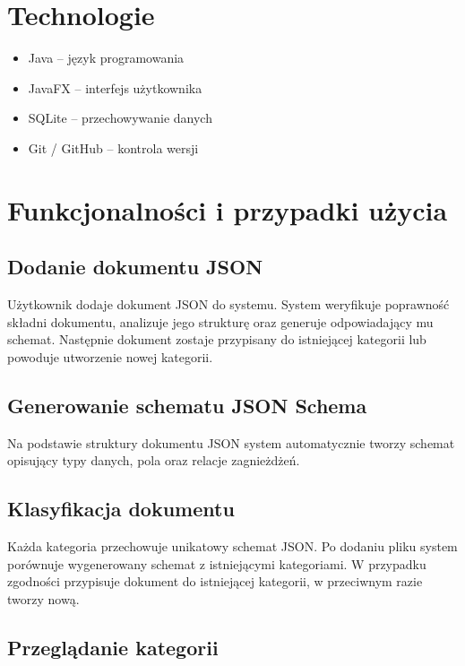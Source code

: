 \documentclass[a4paper,12pt]{article}
\begin{document}
\section{Technologie}

\begin{itemize}
  \item Java -- język programowania
  \item JavaFX -- interfejs użytkownika
  \item SQLite -- przechowywanie danych
  \item Git / GitHub -- kontrola wersji
\end{itemize}

\section{Funkcjonalności i przypadki użycia}

\subsection{Dodanie dokumentu JSON}

Użytkownik dodaje dokument JSON do systemu. System weryfikuje poprawność składni dokumentu, analizuje jego strukturę oraz generuje odpowiadający mu schemat. Następnie dokument zostaje przypisany do istniejącej kategorii lub powoduje utworzenie nowej kategorii.

\subsection{Generowanie schematu JSON Schema}

Na podstawie struktury dokumentu JSON system automatycznie tworzy schemat opisujący typy danych, pola oraz relacje zagnieżdżeń.

\subsection{Klasyfikacja dokumentu}

Każda kategoria przechowuje unikatowy schemat JSON. Po dodaniu pliku system porównuje wygenerowany schemat z istniejącymi kategoriami. W przypadku zgodności przypisuje dokument do istniejącej kategorii, w przeciwnym razie tworzy nową.

\subsection{Przeglądanie kategorii}
\end{document}
